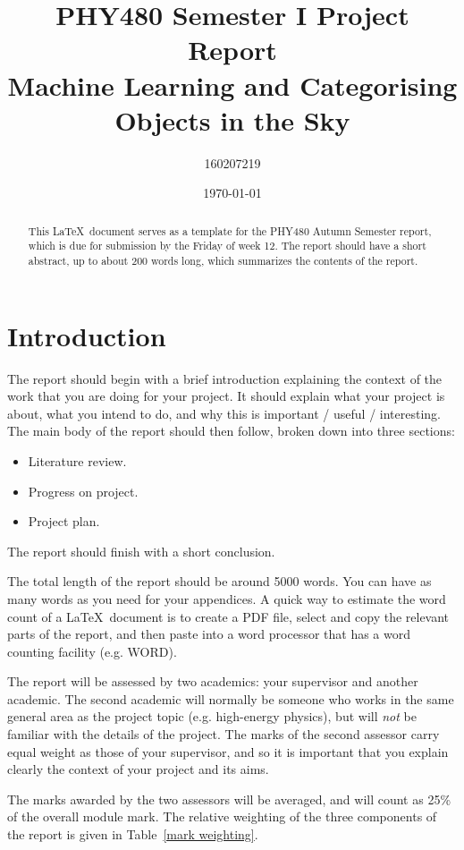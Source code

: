 \documentclass[a4paper,11pt]{article}
\title{{\small PHY480 Semester I Project Report}
\\
\vspace{5mm}
Machine Learning and Categorising Objects in the Sky}
\author{160207219}
\date{\today}
\begin{document}
\maketitle

\begin{abstract}
This \LaTeX\ document serves as a template for the PHY480 Autumn Semester report, which is due for submission by the Friday of week 12. The report should have a short abstract, up to about 200 words long, which summarizes the contents of the report.\\

\end{abstract}

\section{Introduction}
\label{sec:introduction}

The report should begin with a brief introduction explaining the context of the work that you are doing for your project. It should explain what your project is about, what you intend to do, and why this is important / useful / interesting. The main body of the report should then follow, broken down into three sections:
\begin{itemize}
\item Literature review.
\item Progress on project.
\item Project plan.
\end{itemize}
The report should finish with a short conclusion.

The total length of the report should be around 5000 words. You can have as many words as you need for your appendices. A quick way to estimate the word count of a \LaTeX\ document is to create a PDF file, select and copy the relevant parts  of the report, and then paste into a word processor that has a word counting facility (e.g. WORD).

The report will be assessed by two academics: your supervisor and another academic. The second academic will normally be someone who works in the same general area as the project topic (e.g. high-energy physics), but will {\em not} be familiar with the details of the project. The marks of the second assessor carry equal weight as those of your supervisor, and so it is important that you explain clearly the context of your project and its aims.

The marks awarded by the two assessors will be averaged, and will count as 25\% of the overall module mark.
The relative weighting of the three components of the report is given in Table~\ref{mark weighting}.
\end{document}

